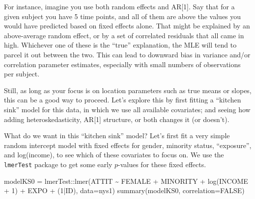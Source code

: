 \documentclass[
  letterpaper,
  DIV=11,
  numbers=noendperiod]{scrreprt}
\newenvironment{Shaded}{\begin{snugshade}}{\end{snugshade}}
\newcommand{\AttributeTok}[1]{\textcolor[rgb]{0.49,0.56,0.16}{#1}}
\newcommand{\ConstantTok}[1]{\textcolor[rgb]{0.53,0.00,0.00}{#1}}
\newcommand{\DecValTok}[1]{\textcolor[rgb]{0.25,0.63,0.44}{#1}}
\newcommand{\FunctionTok}[1]{\textcolor[rgb]{0.02,0.16,0.49}{#1}}
\newcommand{\NormalTok}[1]{\textcolor[rgb]{0.00,0.44,0.13}{#1}}
\newcommand{\OtherTok}[1]{\textcolor[rgb]{0.00,0.44,0.13}{#1}}
\newcommand{\SpecialCharTok}[1]{\textcolor[rgb]{0.25,0.44,0.63}{#1}}
\begin{document}
For instance, imagine you use both random effects and AR{[}1{]}. Say
that for a given subject you have 5 time points, and all of them are
above the values you would have predicted based on fixed effects alone.
That might be explained by an above-average random effect, or by a set
of correlated residuals that all came in high. Whichever one of these is
the ``true'' explanation, the MLE will tend to parcel it out between the
two. This can lead to downward bias in variance and/or correlation
parameter estimates, especially with small numbers of observations per
subject.

Still, as long as your focus is on location parameters such as true
means or slopes, this can be a good way to proceed. Let's explore this
by first fitting a ``kitchen sink'' model for this data, in which we use
all available covariates; and seeing how adding heteroskedasticity,
AR{[}1{]} structure, or both changes it (or doesn't).

What do we want in this ``kitchen sink'' model? Let's first fit a very
simple random intercept model with fixed effects for gender, minority
status, ``exposure'', and log(income), to see which of these covariates
to focus on. We use the \texttt{lmerTest} package to get some early
\(p\)-values for these fixed effects.

\begin{Shaded}
\begin{Highlighting}[]
\NormalTok{modelKS0 }\OtherTok{=}\NormalTok{ lmerTest}\SpecialCharTok{::}\FunctionTok{lmer}\NormalTok{(ATTIT }\SpecialCharTok{\textasciitilde{}}\NormalTok{ FEMALE }\SpecialCharTok{+}\NormalTok{ MINORITY }\SpecialCharTok{+} \FunctionTok{log}\NormalTok{(INCOME }\SpecialCharTok{+} \DecValTok{1}\NormalTok{) }\SpecialCharTok{+}\NormalTok{ EXPO }\SpecialCharTok{+}\NormalTok{ (}\DecValTok{1}\SpecialCharTok{|}\NormalTok{ID), }\AttributeTok{data=}\NormalTok{nys1)}
\FunctionTok{summary}\NormalTok{(modelKS0, }\AttributeTok{correlation=}\ConstantTok{FALSE}\NormalTok{)}
\end{Highlighting}
\end{Shaded}
\end{document}
